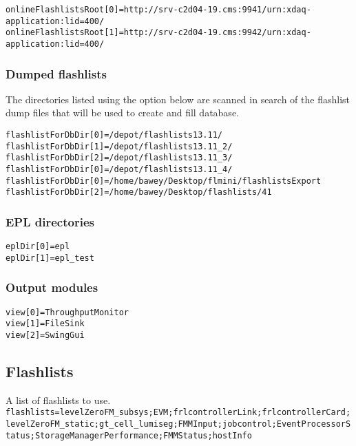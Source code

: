 \texttt{onlineFlashlistsRoot[0]=http://srv-c2d04-19.cms:9941/urn:xdaq-application:lid=400/} \\
\texttt{onlineFlashlistsRoot[1]=http://srv-c2d04-19.cms:9942/urn:xdaq-application:lid=400/} \\

\subsubsection{Dumped flashlists}\label{subsec:dumps}
The directories listed using the option below are scanned in search of the flashlist dump files that will be used to create and fill database.

\texttt{flashlistForDbDir[0]=/depot/flashlists13.11/} \\
\texttt{flashlistForDbDir[1]=/depot/flashlists13.11\_2/} \\
\texttt{flashlistForDbDir[2]=/depot/flashlists13.11\_3/} \\
\texttt{flashlistForDbDir[0]=/depot/flashlists13.11\_4/} \\
\texttt{flashlistForDbDir[0]=/home/bawey/Desktop/flmini/flashlistsExport} \\
\texttt{flashlistForDbDir[2]=/home/bawey/Desktop/flashlists/41} \\


\subsubsection{EPL directories}
\texttt{eplDir[0]=epl} \\
\texttt{eplDir[1]=epl\_test}\\


\subsubsection{Output modules}
\texttt{view[0]=ThroughputMonitor} \\
\texttt{view[1]=FileSink} \\
\texttt{view[2]=SwingGui} \\

\subsection{Flashlists}
A list of flashlists to use. \\
\texttt{flashlists=levelZeroFM\_subsys;EVM;frlcontrollerLink;frlcontrollerCard;levelZeroFM\_static;gt\_cell\_lumiseg;FMMInput;jobcontrol;EventProcessorStatus;StorageManagerPerformance;FMMStatus;hostInfo}

